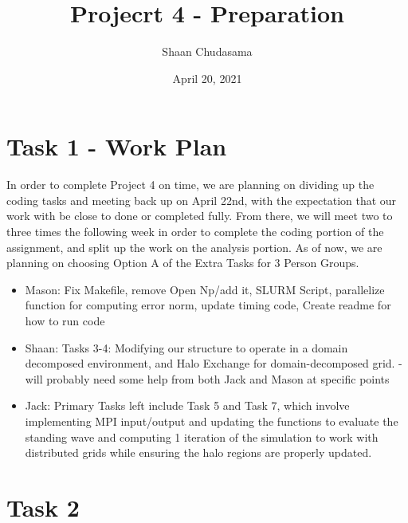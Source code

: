 \documentclass{article}
\title{Projecrt 4 - Preparation}
\author{Shaan Chudasama}
\date{April 20, 2021}
\begin{document}
\maketitle
\section*{Task 1 - Work Plan}

In order to complete Project 4 on time, we are planning on dividing up the coding tasks and meeting back up on April 22nd, with the expectation that our work with be close to done or completed fully. From there, we will meet two to three times the following week in order to complete the coding portion of the assignment, and split up the work on the analysis portion. As of now, we are planning on choosing Option A of the Extra Tasks for 3 Person Groups. 

\begin{itemize}
    \item Mason:
    Fix Makefile, remove Open Np/add it, SLURM Script, parallelize function for computing error norm, update timing code, Create readme for how to run code
    
    \item Shaan:
    Tasks 3-4:  Modifying our structure to operate in a domain decomposed environment, and Halo Exchange for domain-decomposed grid. - will probably need some help from both Jack and Mason at specific points
    
    \item Jack:
    Primary Tasks left include Task 5 and Task 7, which involve implementing MPI input/output and updating the functions to evaluate the standing wave and computing 1 iteration of the simulation to work with distributed grids while ensuring the halo regions are properly updated.
\end{itemize}

\maketitle
\section*{Task 2}
\end{document}

